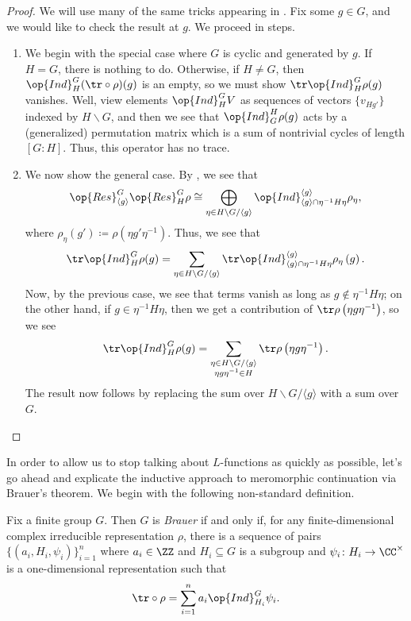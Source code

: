 \documentclass[../thesis.tex]{subfiles}
\begin{document}
\begin{proof}
	We will use many of the same tricks appearing in . Fix some $g\in G$, and we would like to check the result at $g$. We proceed in steps.
	\begin{enumerate}
		\item We begin with the special case where $G$ is cyclic and generated by $g$. If $H=G$, there is nothing to do. Otherwise, if $H\ne G$, then $\op{Ind}^G_H({\tr\circ\rho})(g)$ is an empty, so we must show $\tr\op{Ind}_H^G\rho(g)$ vanishes. Well, view elements $\op{Ind}_H^GV$ as sequences of vectors $\{v_{Hg'}\}$ indexed by $H\backslash G$, and then we see that $\op{Ind}_G^H\rho(g)$ acts by a (generalized) permutation matrix which is a sum of nontrivial cycles of length $[G:H]$. Thus, this operator has no trace.
		\item We now show the general case. By , we see that
		\[\op{Res}^G_{\langle g\rangle}\op{Res}^G_H\rho\cong\bigoplus_{\eta\in H\backslash G/\langle g\rangle}\op{Ind}^{\langle g\rangle}_{\langle g\rangle\cap\eta^{-1}H\eta}\rho_\eta,\]
		where $\rho_\eta(g')\coloneqq\rho\left(\eta g'\eta^{-1}\right)$. Thus, we see that
		\[\tr\op{Ind}_H^G\rho(g)=\sum_{\eta\in H\backslash G/\langle g\rangle}\tr\op{Ind}_{\langle g\rangle\cap\eta^{-1}H\eta}^{\langle g\rangle}\rho_\eta\left(g\right).\]
		Now, by the previous case, we see that terms vanish as long as $g\notin\eta^{-1}H\eta$; on the other hand, if $g\in\eta^{-1}H\eta$, then we get a contribution of $\tr\rho\left(\eta g\eta^{-1}\right)$, so we see
		\[\tr\op{Ind}_H^G\rho(g)=\sum_{\substack{\eta\in H\backslash G/\langle g\rangle\\\eta g\eta^{-1}\in H}}\tr\rho\left(\eta g\eta^{-1}\right).\]
		The result now follows by replacing the sum over $H\backslash G/\langle g\rangle$ with a sum over $G$.
		\qedhere
	\end{enumerate}
\end{proof}
In order to allow us to stop talking about $L$-functions as quickly as possible, let's go ahead and explicate the inductive approach to meromorphic continuation via Brauer's theorem. We begin with the following non-standard definition.
\begin{definition}[Brauer]
	Fix a finite group $G$. Then $G$ is \textit{Brauer} if and only if, for any finite-dimensional complex irreducible representation $\rho$, there is a sequence of pairs $\{(a_i,H_i,\psi_i)\}_{i=1}^n$ where $a_i\in\ZZ$ and $H_i\subseteq G$ is a subgroup and $\psi_i\colon H_i\to\CC^\times$ is a one-dimensional representation such that
	\[{\tr}\circ\rho=\sum_{i=1}^na_i\op{Ind}_{H_i}^G\psi_i.\]
\end{definition}
\end{document}
